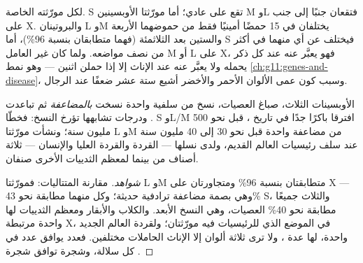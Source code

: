 \begin{proposition}\label{prop:g11:the-eye:genes}
لكل  مورّثته الخاصة.   S تقع على  عادي؛ أما
مورّثتا الأوبسينين M وL فتقعان جنبًا إلى جنب على  X. والبروتينان
L وM يختلفان في 15 حمضًا أمينيًا فقط من حموضهما الأربعة والستين بعد الثلاثمئة (فهما متطابقان
بنسبة 96\%)، أما  S فيختلف عن أي منهما في أكثر من نصف مواضعه.
ولما كان  غير العامل  M أو L على  X، فهو يعبَّر عنه عند كل
ذكر يحمله ولا يعبَّر عنه عند الإناث إلا إذا حملن اثنين --- وهو نمط
\cref{ch:g11:genes-and-disease}، وسبب كون عمى الألوان الأحمر والأخضر
أشيع ستة عشر ضعفًا عند الرجال.
\end{proposition}
\admitted

\begin{proposition}\label{prop:g11:the-eye:family}
 الأوبسينات الثلاث،  صباغ العصيات، نسخ من  سلفية
واحدة نسخت \emph{بالمضاعفة} ثم تباعدت . ودرجات تشابهها تؤرخ
النسخ: فخطّا S وL/M افترقا باكرًا جدًا في تاريخ ، قبل نحو 500
مليون سنة؛ ونشأت مورّثتا L وM من مضاعفة واحدة قبل نحو 30 إلى 40 مليون
سنة عند سلف رئيسيات العالم القديم، ولدى نسلها --- القردة والقردة
العليا والإنسان --- ثلاثة أصناف من  بينما لمعظم الثدييات
الأخرى صنفان.
\end{proposition}
\begin{proof}[شواهد]
مقارنة المتتاليات: فمورّثتا L وM متطابقتان بنسبة 96\% ومتجاورتان على
 X --- وهي بصمة مضاعفة ترادفية حديثة؛ وكل منهما مطابقة نحو 43\%
 S، والثلاث جميعًا مطابقة نحو 40\%   العصيات، وهي
النسخ الأبعد. والكلاب والأبقار ومعظم الثدييات لها   واحدة
مرتبطة  X، في الموضع الذي للرئيسيات فيه مورّثتان؛ ولقردة العالم
الجديد واحدة، لها عدة ، ولا ترى ثلاثة ألوان إلا الإناث الحاملات
 مختلفين. فعدد  يوافق عدد  في كل سلالة، وشجرة
 توافق شجرة .
\end{proof}

